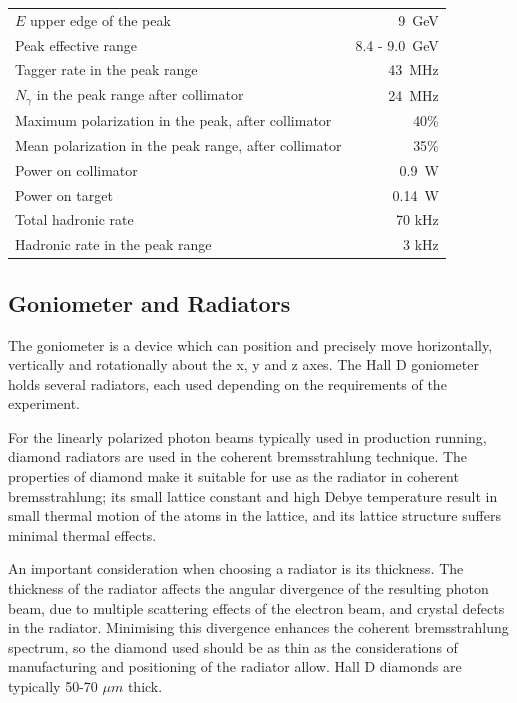 \begin{table}[tbp]
\begin{center}
\begin{tabular}{|l|r|}
\hline\hline
$E$ upper edge of the peak & 9~GeV \\
Peak effective range       & 8.4 - 9.0~GeV\\
Tagger rate in the peak range & 43~MHz  \\
$N_{\gamma}$ in the peak range after collimator & 24~MHz  \\
Maximum polarization in the peak, after collimator & 40\% \\
Mean polarization in the peak range, after collimator & 35\% \\
Power on collimator & 0.9~W \\
Power on target & 0.14~W \\
Total hadronic rate & 70 kHz \\
Hadronic rate in the peak range & 3 kHz \\
\hline\hline
\end{tabular}
\end{center}
\end{table}


\subsection{Goniometer and Radiators \label{sec:radiators}}
The goniometer is a device which can position and precisely move horizontally, vertically and rotationally about the x, y and z axes.
The Hall D goniometer holds several radiators, each used depending on the requirements of the experiment.

For the linearly polarized photon beams typically used in \GX{} production running, diamond radiators are used in the coherent bremsstrahlung technique.
The properties of diamond make it suitable for use as the radiator in coherent bremsstrahlung; its small lattice constant and high Debye temperature result in small thermal motion of the atoms in the lattice, and its lattice structure suffers minimal thermal effects.

An important consideration when choosing a radiator is its thickness. The thickness of the radiator affects the angular divergence of the resulting photon beam, due to multiple scattering effects of the electron beam, and crystal defects in the radiator.
Minimising this divergence enhances the coherent bremsstrahlung spectrum, so the diamond used should be as thin as the considerations of manufacturing and
positioning of the radiator allow.
Hall D diamonds are typically 50-70 $\mu m$ thick.

